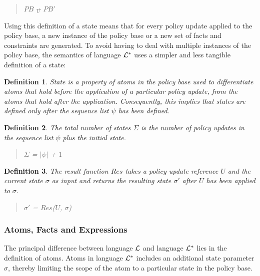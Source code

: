 \documentclass[10pt, twocolumn]{article}
\newtheorem{definition}{Definition}
\begin{document}
        \begin{quote}
          $PB$ $\overrightarrow{_{U}}$ $PB'$
        \end{quote}

        Using this definition of a state means that for every policy update
        applied to the policy base, a new instance of the policy base or a new 
        set of facts and constraints are generated. To avoid having to deal
        with multiple instances of the policy base, the semantics of language
        ${\cal L}^{*}$ uses a simpler and less tangible definition of a state:

        \begin{definition}
          State is a property of atoms in the policy base used to differentiate
          atoms that hold before the application of a particular policy update,
          from the atoms that hold after the application. Consequently, this
          implies that states are defined only after the sequence list $\psi$
          has been defined.
        \end{definition}

        \begin{definition}
          The total number of states $\Sigma$ is the number of policy updates
          in the sequence list $\psi$ plus the initial state.
          \begin{quote}
            $\Sigma$ = $|\psi|$ + $1$
          \end{quote}
        \end{definition}

        \begin{definition}
          The result function $Res$ takes a policy update reference $U$ and
          the current state $\sigma$ as input and returns the resulting state
          $\sigma'$ after $U$ has been applied to $\sigma$.

          \begin{quote}
            $\sigma'$ = $Res$($U$, $\sigma$)
          \end{quote}
        \end{definition}

      \subsubsection{Atoms, Facts and Expressions}

        The principal difference between language ${\cal L}$ and language
        ${\cal L}^{*}$ lies in the definition of atoms. Atoms in language
        ${\cal L}^{*}$ includes an additional state parameter $\sigma$, thereby
        limiting the scope of the atom to a particular state in the policy
        base.
\end{document}
